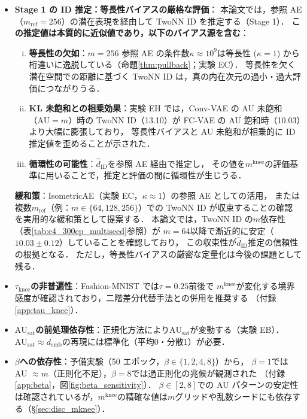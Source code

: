 \documentclass[11pt,a4paper]{jsarticle}
\newcommand{\kap}{\kappa}
\newcommand{\AUsat}{\mathrm{AU}_{\mathrm{sat}}}
\newcommand{\mknee}{m^{\mathrm{knee}}}
\newcommand{\demb}{d_{\mathrm{emb}}}
\begin{document}
\begin{itemize}
  \item \textbf{Stage 1 の ID 推定：等長性バイアスの厳格な評価}：
        本論文では，参照 AE（$m_\mathrm{ref}=256$）の潜在表現を経由して TwoNN ID を推定する（Stage 1）．
        \textbf{この推定値は本質的に近似値であり，以下のバイアス源を含む}：
        \begin{enumerate}[(i)]
          \item \textbf{等長性の欠如}：$m=256$ 参照 AE の条件数$\kap \approx 10^9$は等長性
                ($\kap=1$) から桁違いに逸脱している（命題\ref{thm:pullback}；実験 EC）．
                等長性を欠く潜在空間での距離に基づく TwoNN ID は，真の内在次元の過小・過大評価につながりうる．
          \item \textbf{KL 未飽和との相乗効果}：実験 EH では，Conv-VAE の AU 未飽和（AU$=m$）時の
                TwoNN ID（13.10）が FC-VAE の AU 飽和時（10.03）より大幅に膨張しており，
                等長性バイアスと AU 未飽和が相乗的に ID 推定値を歪めることが示された．
          \item \textbf{循環性の可能性}：$\hat{d}_\mathrm{ID}$を参照 AE 経由で推定し，
                その値を$\mknee$の評価基準に用いることで，推定と評価の間に循環性が生じうる．
        \end{enumerate}
        \textbf{緩和策}：IsometricAE（実験 EC，$\kap \approx 1$）の参照 AE としての活用，
        または複数$m_\mathrm{ref}$（例：$m \in \{64, 128, 256\}$）での TwoNN ID が収束することの確認
        を実用的な緩和策として提案する．
        本論文では，TwoNN ID の$m$依存性（表\ref{tab:e4_300ep_multiseed}参照）が
        $m=64$以降で漸近的に安定（$10.03 \pm 0.12$）していることを確認しており，
        この収束性が$\hat{d}_\mathrm{ID}$推定の信頼性の根拠となる．
        ただし，等長性バイアスの厳密な定量化は今後の課題として残る．
  \item \textbf{$\tau_{\mathrm{knee}}$の非普遍性}：Fashion-MNIST では$\tau = 0.25$前後で
        $\mknee$が変化する境界感度が確認されており，二階差分代替手法との併用を推奨する
        （付録\ref{app:tau_knee}）．
  \item \textbf{$\AUsat$の前処理依存性}：正規化方法により$\AUsat$が変動する（実験 EB）．
        $\AUsat \approx \demb$の再現には標準化（平均0・分散1）が必要．
  \item \textbf{$\beta$への依存性}：予備実験（50 エポック，$\beta \in \{1,2,4,8\}$）から，
        $\beta = 1$では AU $\approx m$（正則化不足），$\beta = 8$では過正則化の兆候が観測された
        （付録\ref{app:beta}，図\ref{fig:beta_sensitivity}）．
        $\beta \in [2, 8]$での AU パターンの安定性は確認されているが，$\mknee$の精確な値は$m$グリッドや乱数シードにも依存する（§\ref{sec:disc_mknee}）．
\end{itemize}
\end{document}
